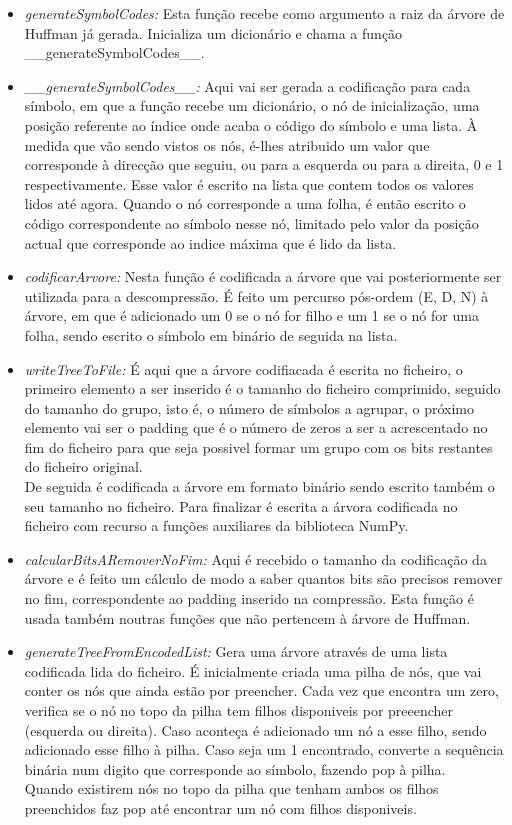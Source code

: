 \documentclass[paper=a4, fontsize=11pt]{scrartcl}
\numberwithin{equation}{section}		%
\numberwithin{figure}{section}			%
\numberwithin{table}{section}				%
\begin{document}
\begin{itemize}
  \item {\it generateSymbolCodes:} Esta função recebe como argumento a raiz da árvore de Huffman já gerada. Inicializa um dicionário e chama a função \_\_generateSymbolCodes\_\_.
  
  \item {\it \_\_generateSymbolCodes\_\_:} Aqui vai ser gerada a codificação para cada símbolo, em que a função recebe um dicionário, o nó de inicialização, uma posição referente ao índice onde acaba o código do símbolo e uma lista. À medida que vão sendo vistos os nós, é-lhes atribuido um valor que corresponde à direcção que seguiu, ou para a esquerda ou para a direita, 0 e 1 respectivamente. Esse valor é escrito na lista que contem todos os valores lidos até agora. Quando o nó corresponde a uma folha, é então escrito o código correspondente ao símbolo nesse nó, limitado pelo valor da posição actual que corresponde ao indice máxima que é lido da lista.
  
  \item {\it codificarArvore:} Nesta função é codificada a árvore que vai posteriormente ser utilizada para a descompressão. 
  É feito um percurso pós-ordem (E, D, N) à árvore, em que é adicionado um 0 se o nó for filho e um 1 se o nó for uma folha, sendo escrito o símbolo em binário de seguida na lista.
  
  \item {\it writeTreeToFile:} É aqui que a árvore codifiacada é escrita no ficheiro, o primeiro elemento a ser inserido é o tamanho do ficheiro comprimido, seguido do tamanho do grupo, isto é, o número de símbolos a agrupar, o próximo elemento vai ser o padding que é o número de zeros a ser a acrescentado no fim do ficheiro para que seja possivel formar um grupo com os bits restantes do ficheiro original.\\ De seguida é codificada a árvore em formato binário sendo escrito também o seu tamanho no ficheiro. Para finalizar é escrita a árvora codificada no ficheiro com recurso a funções auxiliares da biblioteca NumPy.
  
  \item {\it calcularBitsARemoverNoFim:} Aqui é recebido o tamanho da codificação da árvore e é feito um cálculo de modo a saber quantos bits são precisos remover no fim, correspondente ao padding inserido na compressão. Esta função é usada também noutras funções que não pertencem  à árvore de Huffman.
  
  \item {\it generateTreeFromEncodedList:} Gera uma árvore através de uma lista codificada lida do ficheiro. É inicialmente criada uma pilha de nós, que vai conter os nós que ainda estão por preencher. 
  Cada vez que encontra um zero, verifica se o nó no topo da pilha tem filhos disponiveis por preeencher (esquerda ou direita). Caso aconteça é adicionado um nó a esse filho, sendo adicionado esse filho à pilha.
  Caso seja um 1 encontrado, converte a sequência binária num digito que corresponde ao símbolo, fazendo pop à pilha. 
  \\Quando existirem nós no topo da pilha que tenham ambos os filhos preenchidos faz pop até encontrar um nó com filhos disponiveis.


\end{itemize}
\end{document}
